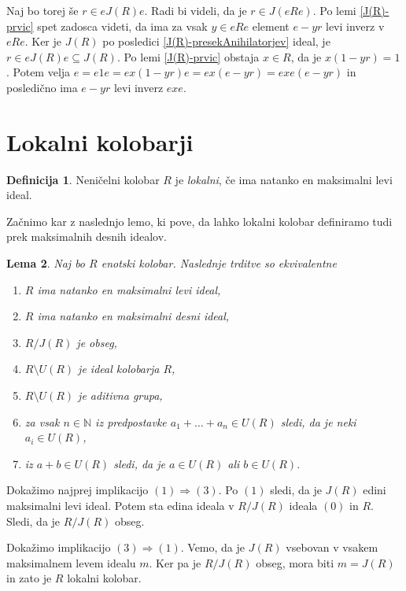 \documentclass[a4paper, 12pt]{amsart}
\theoremstyle{definition} %
\newtheorem{definicija}{Definicija}[section]
\theoremstyle{plain} %
\newtheorem{lema}[definicija]{Lema}
\newcommand{\N}{\mathbb N}
\begin{document}
Naj bo torej še $r\in eJ(R)e$. Radi bi videli, da je $r\in J(eRe)$. Po lemi \ref{J(R)-prvic} spet zadosca videti, da ima za vsak  $y\in eRe$ element $e-yr$ levi inverz v $eRe$. Ker je $J(R)$ po posledici \ref{J(R)-presekAnihilatorjev} ideal, je $r\in eJ(R)e \subseteq J(R)$. Po lemi \ref{J(R)-prvic} obstaja $x\in R$, da je $x(1-yr) = 1$. Potem velja $e = e1 e = ex(1-yr)e = ex(e-yr)= exe(e-yr)$ in posledično ima $e-yr$ levi inverz $exe$.
\endproof

\section{Lokalni kolobarji}

\begin{definicija}
Neničelni kolobar $R$ je \emph{lokalni}, če ima natanko en maksimalni levi ideal.
\end{definicija}

Začnimo kar z naslednjo lemo, ki pove, da lahko lokalni kolobar definiramo tudi prek maksimalnih desnih idealov.

\begin{lema}
Naj bo $R$ enotski kolobar. Naslednje trditve so ekvivalentne
\label{classLocal}
\begin{enumerate}
\item $R$ ima natanko en maksimalni levi ideal,
\item $R$ ima natanko en maksimalni desni ideal,
\item $R/J(R)$ je obseg,
\item $R\setminus U(R)$ je ideal kolobarja $R$,
\item $R\setminus U(R)$ je aditivna grupa,
\item za vsak $n\in \N$ iz predpostavke $a_1 + \dots + a_n \in U(R)$ sledi, da je neki $a_i \in U(R)$,
\item iz $a+b\in U(R)$ sledi, da je $a\in U(R)$ ali $b\in U(R)$.
\end{enumerate}
\end{lema}

\proof
Dokažimo najprej implikacijo $(1) \Rightarrow (3)$. Po $(1)$ sledi, da je $J(R)$ edini maksimalni levi ideal. Potem sta edina ideala v $R/J(R)$ ideala $(0)$ in $R$. Sledi, da je $R/J(R)$ obseg.

Dokažimo implikacijo $(3) \Rightarrow (1)$. Vemo, da je $J(R)$ vsebovan v vsakem maksimalnem levem idealu $m$. Ker pa je $R/J(R)$ obseg, mora biti $m=J(R)$ in zato je $R$ lokalni kolobar.
\end{document}
